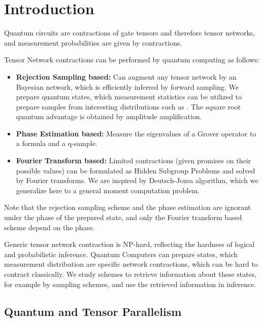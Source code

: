 \section{Introduction}

Quantum circuits are contractions of gate tensors and therefore tensor networks, and measurement probabilities are given by contractions.


Tensor Network contractions can be performed by quantum computing as follows:
\begin{itemize}
    \item \textbf{Rejection Sampling based:}
    Can augment any tensor network by an Bayesian network, which is efficiently inferred by forward sampling.
    We prepare quantum states, which measurement statistics can be utilized to prepare samples from interesting distributions such as \ComputationActivationNetworks{}.
    The square root quantum advantage is obtained by amplitude amplification.
    \item \textbf{Phase Estimation based:}
    Measure the eigenvalues of a Grover operator to a formula and a q-sample.
    \item \textbf{Fourier Transform based:}
    Limited contractions (given promises on their possible values) can be formulated as Hidden Subgroup Problems and solved by Fourier transforms.
    We are inspired by Deutsch-Jozsa algorithm, which we generalize here to a general moment computation problem.
\end{itemize}

%
Note that the rejection sampling scheme and the phase estimation are ignorant under the phase of the prepared state, and only the Fourier transform based scheme depend on the phase.

Generic tensor network contraction is $\mathrm{NP}$-hard, reflecting the hardness of logical and probabilistic inference.
Quantum Computers can prepare states, which measurement distribution are specific network contractions, which can be hard to contract classically.
We study schemes to retrieve information about these states, for example by sampling schemes, and use the retrieved information in inference.

\subsection{Quantum and Tensor Parallelism}

